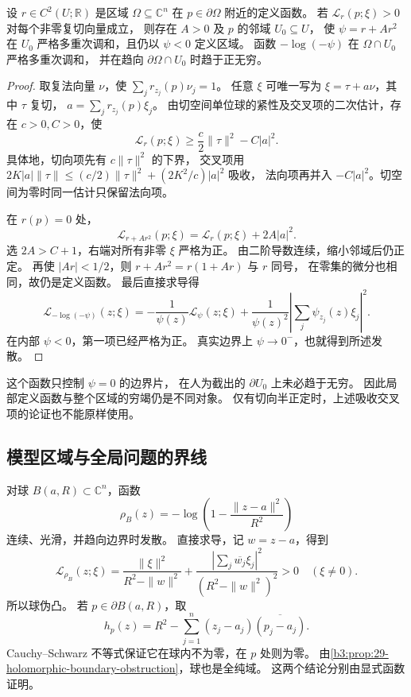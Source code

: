 \begin{proposition}[强伪凸点的局部定义函数]\label{b3:prop:29-strict-levi-local}
设 \(r\in C^2(U;\mathbb R)\) 是区域 \(\Omega\subseteq\mathbb C^n\)
在 \(p\in\partial\Omega\) 附近的定义函数。
若 \(\mathcal L_r(p;\xi)>0\) 对每个非零复切向量成立，
则存在 \(A>0\) 及 \(p\) 的邻域 \(U_0\subseteq U\)，
使 \(\psi=r+Ar^2\) 在 \(U_0\) 严格多重次调和，且仍以 \(\psi<0\) 定义区域。
函数 \(-\log(-\psi)\) 在 \(\Omega\cap U_0\) 严格多重次调和，
并在趋向 \(\partial\Omega\cap U_0\) 时趋于正无穷。
\end{proposition}
\begin{proof}
取复法向量 \(\nu\)，使 \(\sum_j r_{z_j}(p)\nu_j=1\)。
任意 \(\xi\) 可唯一写为 \(\xi=\tau+a\nu\)，其中 \(\tau\) 复切，
\(a=\sum_jr_{z_j}(p)\xi_j\)。
由切空间单位球的紧性及交叉项的二次估计，存在 \(c>0,C>0\)，使
\[
 \mathcal L_r(p;\xi)\ge\frac c2\|\tau\|^2-C|a|^2.
\]
具体地，切向项先有 \(c\|\tau\|^2\) 的下界，
交叉项用 \(2K|a|\|\tau\|\le(c/2)\|\tau\|^2+(2K^2/c)|a|^2\) 吸收，
法向项再并入 \(-C|a|^2\)。切空间为零时同一估计只保留法向项。

在 \(r(p)=0\) 处，
\[
 \mathcal L_{r+Ar^2}(p;\xi)
 =\mathcal L_r(p;\xi)+2A|a|^2.
\]
选 \(2A>C+1\)，右端对所有非零 \(\xi\) 严格为正。
由二阶导数连续，缩小邻域后仍正定。
再使 \(|Ar|<1/2\)，则 \(r+Ar^2=r(1+Ar)\) 与 \(r\) 同号，
在零集的微分也相同，故仍是定义函数。
最后直接求导得
\[
 \mathcal L_{-\log(-\psi)}(z;\xi)
 =-\frac1{\psi(z)}\mathcal L_\psi(z;\xi)
  +\frac1{\psi(z)^2}\left|\sum_j\psi_{z_j}(z)\xi_j\right|^2.
\]
在内部 \(\psi<0\)，第一项已经严格为正。
真实边界上 \(\psi\to0^-\)，也就得到所述发散。
\end{proof}

这个函数只控制 \(\psi=0\) 的边界片，
在人为截出的 \(\partial U_0\) 上未必趋于无穷。
因此局部定义函数与整个区域的穷竭仍是不同对象。
仅有切向半正定时，上述吸收交叉项的论证也不能原样使用。

\subsection{模型区域与全局问题的界线}
\label{b3:subsec:290404}

对球 \(B(a,R)\subset\mathbb C^n\)，函数
\[
 \rho_B(z)=-\log\left(1-\frac{\|z-a\|^2}{R^2}\right)
\]
连续、光滑，并趋向边界时发散。
直接求导，记 \(w=z-a\)，得到
\[
 \mathcal L_{\rho_B}(z;\xi)
 =\frac{\|\xi\|^2}{R^2-\|w\|^2}
  +\frac{\left|\sum_j\overline{w_j}\xi_j\right|^2}
         {(R^2-\|w\|^2)^2}>0\quad(\xi\ne0).
\]
所以球伪凸。
若 \(p\in\partial B(a,R)\)，取
\[
 h_p(z)=R^2-\sum_{j=1}^n(z_j-a_j)\overline{(p_j-a_j)}.
\]
Cauchy--Schwarz 不等式保证它在球内不为零，在 \(p\) 处则为零。
由\cref{b3:prop:29-holomorphic-boundary-obstruction}，球也是全纯域。
这两个结论分别由显式函数证明。

